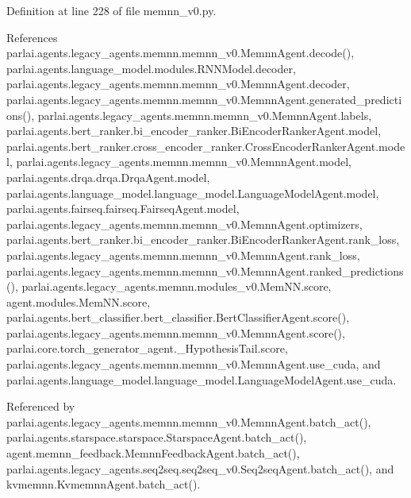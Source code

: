 Definition at line 228 of file memnn\+\_\+v0.\+py.



References parlai.\+agents.\+legacy\+\_\+agents.\+memnn.\+memnn\+\_\+v0.\+Memnn\+Agent.\+decode(), parlai.\+agents.\+language\+\_\+model.\+modules.\+R\+N\+N\+Model.\+decoder, parlai.\+agents.\+legacy\+\_\+agents.\+memnn.\+memnn\+\_\+v0.\+Memnn\+Agent.\+decoder, parlai.\+agents.\+legacy\+\_\+agents.\+memnn.\+memnn\+\_\+v0.\+Memnn\+Agent.\+generated\+\_\+predictions(), parlai.\+agents.\+legacy\+\_\+agents.\+memnn.\+memnn\+\_\+v0.\+Memnn\+Agent.\+labels, parlai.\+agents.\+bert\+\_\+ranker.\+bi\+\_\+encoder\+\_\+ranker.\+Bi\+Encoder\+Ranker\+Agent.\+model, parlai.\+agents.\+bert\+\_\+ranker.\+cross\+\_\+encoder\+\_\+ranker.\+Cross\+Encoder\+Ranker\+Agent.\+model, parlai.\+agents.\+legacy\+\_\+agents.\+memnn.\+memnn\+\_\+v0.\+Memnn\+Agent.\+model, parlai.\+agents.\+drqa.\+drqa.\+Drqa\+Agent.\+model, parlai.\+agents.\+language\+\_\+model.\+language\+\_\+model.\+Language\+Model\+Agent.\+model, parlai.\+agents.\+fairseq.\+fairseq.\+Fairseq\+Agent.\+model, parlai.\+agents.\+legacy\+\_\+agents.\+memnn.\+memnn\+\_\+v0.\+Memnn\+Agent.\+optimizers, parlai.\+agents.\+bert\+\_\+ranker.\+bi\+\_\+encoder\+\_\+ranker.\+Bi\+Encoder\+Ranker\+Agent.\+rank\+\_\+loss, parlai.\+agents.\+legacy\+\_\+agents.\+memnn.\+memnn\+\_\+v0.\+Memnn\+Agent.\+rank\+\_\+loss, parlai.\+agents.\+legacy\+\_\+agents.\+memnn.\+memnn\+\_\+v0.\+Memnn\+Agent.\+ranked\+\_\+predictions(), parlai.\+agents.\+legacy\+\_\+agents.\+memnn.\+modules\+\_\+v0.\+Mem\+N\+N.\+score, agent.\+modules.\+Mem\+N\+N.\+score, parlai.\+agents.\+bert\+\_\+classifier.\+bert\+\_\+classifier.\+Bert\+Classifier\+Agent.\+score(), parlai.\+agents.\+legacy\+\_\+agents.\+memnn.\+memnn\+\_\+v0.\+Memnn\+Agent.\+score(), parlai.\+core.\+torch\+\_\+generator\+\_\+agent.\+\_\+\+Hypothesis\+Tail.\+score, parlai.\+agents.\+legacy\+\_\+agents.\+memnn.\+memnn\+\_\+v0.\+Memnn\+Agent.\+use\+\_\+cuda, and parlai.\+agents.\+language\+\_\+model.\+language\+\_\+model.\+Language\+Model\+Agent.\+use\+\_\+cuda.



Referenced by parlai.\+agents.\+legacy\+\_\+agents.\+memnn.\+memnn\+\_\+v0.\+Memnn\+Agent.\+batch\+\_\+act(), parlai.\+agents.\+starspace.\+starspace.\+Starspace\+Agent.\+batch\+\_\+act(), agent.\+memnn\+\_\+feedback.\+Memnn\+Feedback\+Agent.\+batch\+\_\+act(), parlai.\+agents.\+legacy\+\_\+agents.\+seq2seq.\+seq2seq\+\_\+v0.\+Seq2seq\+Agent.\+batch\+\_\+act(), and kvmemnn.\+Kvmemnn\+Agent.\+batch\+\_\+act().

